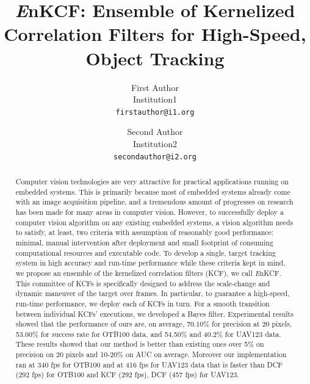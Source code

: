 \documentclass[10pt,twocolumn,letterpaper]{article}
\begin{document}
\title{{\it E}nKCF: Ensemble of Kernelized Correlation Filters for
  High-Speed, Object Tracking}

\author{First Author \\
Institution1\\
{\tt\small firstauthor@i1.org}
\and
Second Author \\
Institution2\\
{\tt\small secondauthor@i2.org}
}

\maketitle
\ifwacvfinal\thispagestyle{empty}\fi

\begin{abstract}
Computer vision technologies are very attractive for practical
applications running on embedded systems. This is primarily because
most of embedded systems already come with an image acquisition
pipeline, and a tremendous amount of progresses on research has been
made for many areas in computer vision. However, to successfully
deploy a computer vision algorithm on any existing embedded systems, a
vision algorithm needs to satisfy, at least, two criteria with
assumption of reasonably good performance: minimal, manual
intervention after deployment and small footprint of consuming
computational resources and executable code. To develop a single,
target tracking system in high accuracy and run-time performance while
these criteria kept in mind, we propose an ensemble of the kernelized
correlation filters (KCF), we call {\it E}nKCF. This committee of KCFs
is specifically designed to address the scale-change and dynamic
maneuver of the target over frames. In particular, to guarantee a
high-speed, run-time performance, we deploy each of KCFs in turn. For
a smooth transition between individual KCFs' executions, we developed
a Bayes filter. Experimental results showed that the performance of
ours are, on average, 70.10\% for precision at 20 pixels, 53.00\% for
success rate for OTB100 data, and 54.50\% and 40.2\% for UAV123
data. These results showed that our method is better than existing
ones over 5\% on precision on 20 pixels and 10-20\% on AUC on
average. Moreover our implementation ran at 340 fps for OTB100 and at
416 fps for UAV123 data that is faster than DCF (292 fps) for OTB100
and KCF (292 fps), DCF (457 fps) for UAV123.
\end{abstract}
\end{document}
